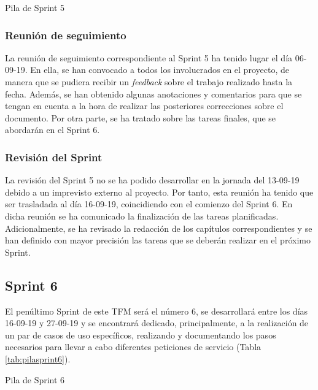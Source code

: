 \begin{table}[!htbp]
	\centering
	{\small
		
	}
	\caption[Pila de Sprint 5]
	{Pila de Sprint 5}
	\label{tab:pilasprint5}
\end{table}

\subsubsection{Reunión de seguimiento}
La reunión de seguimiento correspondiente al Sprint 5 ha tenido lugar el día 06-09-19. En ella, se han convocado a todos los involucrados en el proyecto, de manera que se pudiera recibir un \textit{feedback} sobre el trabajo realizado hasta la fecha. Además, se han obtenido algunas anotaciones y comentarios para que se tengan en cuenta a la hora de realizar las posteriores correcciones sobre el documento. Por otra parte, se ha tratado sobre las tareas finales, que se abordarán en el Sprint 6.

\subsubsection{Revisión del Sprint}
La revisión del Sprint 5 no se ha podido desarrollar en la jornada del 13-09-19 debido a un imprevisto externo al proyecto. Por tanto, esta reunión ha tenido que ser trasladada al día 16-09-19, coincidiendo con el comienzo del Sprint 6. En dicha reunión se ha comunicado la finalización de las tareas planificadas. Adicionalmente, se ha revisado la redacción de los capítulos correspondientes y se han definido con mayor precisión las tareas que se deberán realizar en el próximo Sprint.

\clearpage

\subsection{Sprint 6}
El penúltimo Sprint de este \acs{TFM} será el número 6, se desarrollará entre los días 16-09-19 y 27-09-19 y se encontrará dedicado, principalmente, a la realización de un par de casos de uso específicos, realizando y documentando los pasos necesarios para llevar a cabo diferentes peticiones de servicio (Tabla \ref{tab:pilasprint6}).

\begin{table}[!htbp]
	\centering
	{\small
		
	}
	\caption[Pila de Sprint 6]
	{Pila de Sprint 6}
	\label{tab:pilasprint6}
\end{table}

